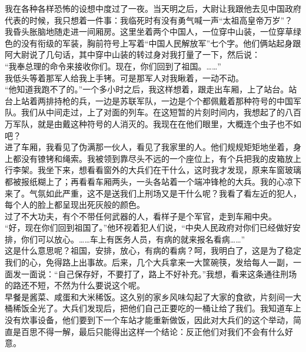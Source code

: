 我在各种各样恐怖的设想中度过了一夜。当天明之后，大尉让我跟他去见中国政府代表的时候，我只想着一件事：我临死时有没有勇气喊一声“太祖高皇帝万岁”？\\

我昏头胀脑地随走进一间厢房。这里坐着两个中国人，一位穿中山装，一位穿草绿色的没有衔级的军装，胸前符号上写着“中国人民解放军”七个字。他们俩站起身跟阿大尉说了几句话，其中穿中山装的转过身对我打量了一下，然后说：\\

“我奉总理的命令来接收你们。现在，你们回到了祖国。……”\\

我低头等着那军人给我上手铐。可是那军人对我瞅着，一动不动。\\

“他知道我跑不了的。”一个多小时之后，我这样想着，跟走出车厢，上了站台。站台上站着两排持枪的兵，一边是苏联军队，一边是个个都佩戴着那种符号的中国军队。我们从中间走过，上了对面的列车。在这短暂的片刻时间内，我想起了的八百万军队，就是由戴这种符号的人消灭的。我现在在他们眼里，大概连个虫子也不如吧？\\

进了车厢，我看见了伪满那一伙人，看见了我家里的人。他们规规矩矩地坐着，身上都没有镣铐和绳索。我被领到靠尽头不远的一个座位上，有个兵把我的皮箱放上行李架。我坐下来，想看看窗外的大兵们在干什么，这时我才发现，原来车窗玻璃都被报纸糊上了；再看看车厢两头，一头各站着一个端冲锋枪的大兵。我的心凉下来了。气氛如此严重，这不是送我们上刑场又是干什么呢？我看了看左近的犯人，每个人的脸上都呈现出死灰般的颜色。\\

过了不大功夫，有个不带任何武器的人，看样子是个军官，走到车厢中央。\\

“好，现在你们回到祖国了。”他环视着犯人们说，“中央人民政府对你们已经做好安排，你们可以放心。……车上有医务人员，有病的就来报名看病……”\\

这是什么意思呢？祖国，安排，放心，有病的看病？呵，我明白了，这是为了稳定我们的心，免得路上出事故。后来，几个大兵拿来一大筐碗筷，发给每人一副，一面发一面说：“自己保存好，不要打了，路上不好补充。”我想，看来这条通往刑场的路还不短，不然为什么要说这个呢。\\

早餐是酱菜、咸蛋和大米稀饭。这久别的家乡风味勾起了大家的食欲，片刻间一大桶稀饭全光了。大兵们发现后，把他们自己正要吃的一桶让给了我们。我知道车上没有炊事设备，他们要到下一个车站才能重新做饭，因此对大兵们的这个举动，简直是百思不得一解，最后只能得出这样一个结论：反正他们对我们不会有什么好意。\\

